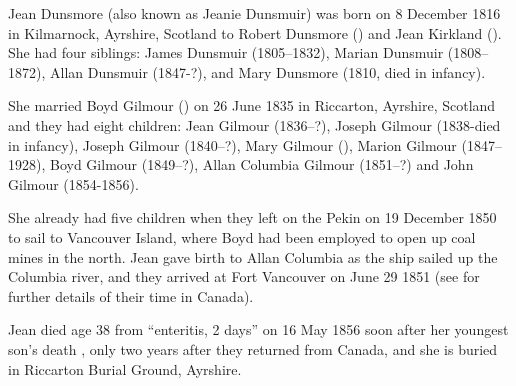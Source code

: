 
Jean Dunsmore (also known as Jeanie Dunsmuir) was born on 8 December 1816 in Kilmarnock, Ayrshire, Scotland to Robert Dunsmore () and Jean Kirkland ().  She had four siblings:  James Dunsmuir (1805--1832), Marian Dunsmuir (1808--1872), Allan Dunsmuir (1847-?),  and Mary Dunsmore (1810, died in infancy).

She married Boyd Gilmour () on 26 June 1835  in Riccarton, Ayrshire, Scotland \cite{JeanDunsmoreMarraige} and they had eight children:  Jean Gilmour (1836--?), Joseph Gilmour (1838-died in infancy), Joseph Gilmour (1840--?), Mary Gilmour (), Marion Gilmour (1847--1928), Boyd Gilmour (1849--?), Allan Columbia Gilmour (1851--?) and John Gilmour (1854-1856).

She already had five children when they left on the Pekin on 19 December 1850 to sail to Vancouver Island, where Boyd had been employed to open up coal mines in the north. Jean gave birth to Allan Columbia as the ship sailed up the Columbia river, and they arrived at Fort Vancouver on June 29 1851 (see  for further details of their time in Canada).  

Jean died age 38 from ``enteritis, 2 days'' on 16 May 1856 soon after her youngest son's death \cite{JeanDunsmoreDeath}, only two years after they returned from Canada, and she is buried in Riccarton Burial Ground, Ayrshire.
